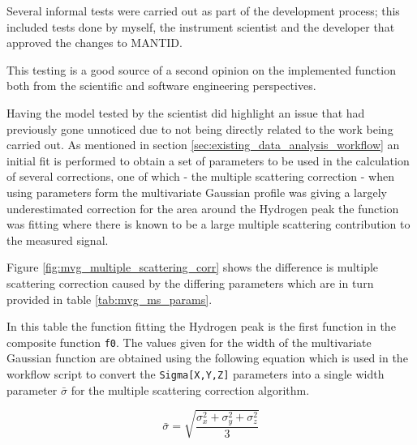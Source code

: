 \documentclass[a4paper]{article}
\begin{document}
Several informal tests were carried out as part of the development process; this
included tests done by myself, the instrument scientist and the developer that
approved the changes to \gls*{MANTID}.

This testing is a good source of a second opinion on the implemented function
both from the scientific and software engineering perspectives.

Having the model tested by the scientist did highlight an issue that had
previously gone unnoticed due to not being directly related to the work being
carried out. As mentioned in section \ref{sec:existing_data_analysis_workflow}
an initial fit is performed to obtain a set of parameters to be used in the
calculation of several corrections, one of which - the multiple scattering
correction - when using parameters form the multivariate Gaussian profile was
giving a largely underestimated correction for the area around the Hydrogen peak
the function was fitting where there is known to be a large multiple scattering
contribution to the measured signal.

Figure \ref{fig:mvg_multiple_scattering_corr} shows the difference is multiple
scattering correction caused by the differing parameters which are in turn
provided in table \ref{tab:mvg_ms_params}.

In this table the function fitting the Hydrogen peak is the first function in
the composite function \texttt{f0}. The values given for the width of the
multivariate Gaussian function are obtained using the following equation which
is used in the workflow script to convert the \texttt{Sigma[X,Y,Z]} parameters
into a single width parameter $\bar{\sigma}$ for the multiple scattering
correction algorithm.

\begin{equation}
  \label{eq:mvg_ms_width}
  \bar{\sigma} =
    \sqrt{\frac{\sigma_{x}^{2} + \sigma_{y}^{2} + \sigma_{z}^{2}}{3}}
\end{equation}
\end{document}
